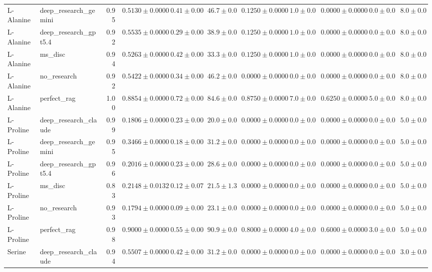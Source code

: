 \begin{table}[htbp]
\begin{tabular}{llrrrrrrrrr}
L-Alanine & deep_research_gemini & 0.95 & $0.5130 \pm 0.0000$ & $0.41 \pm 0.00$ & $46.7 \pm 0.0$ & $0.1250 \pm 0.0000$ & $1.0 \pm 0.0$ & $0.0000 \pm 0.0000$ & $0.0 \pm 0.0$ & $8.0 \pm 0.0$ \\
L-Alanine & deep_research_gpt5.4 & 0.92 & $0.5535 \pm 0.0000$ & $0.29 \pm 0.00$ & $38.9 \pm 0.0$ & $0.1250 \pm 0.0000$ & $1.0 \pm 0.0$ & $0.0000 \pm 0.0000$ & $0.0 \pm 0.0$ & $8.0 \pm 0.0$ \\
L-Alanine & ms_disc & 0.94 & $0.5263 \pm 0.0000$ & $0.42 \pm 0.00$ & $33.3 \pm 0.0$ & $0.1250 \pm 0.0000$ & $1.0 \pm 0.0$ & $0.0000 \pm 0.0000$ & $0.0 \pm 0.0$ & $8.0 \pm 0.0$ \\
L-Alanine & no_research & 0.92 & $0.5422 \pm 0.0000$ & $0.34 \pm 0.00$ & $46.2 \pm 0.0$ & $0.0000 \pm 0.0000$ & $0.0 \pm 0.0$ & $0.0000 \pm 0.0000$ & $0.0 \pm 0.0$ & $8.0 \pm 0.0$ \\
L-Alanine & perfect_rag & 1.00 & \cellcolor{green!25}$0.8854 \pm 0.0000$ & $0.72 \pm 0.00$ & $84.6 \pm 0.0$ & $0.8750 \pm 0.0000$ & $7.0 \pm 0.0$ & $0.6250 \pm 0.0000$ & $5.0 \pm 0.0$ & $8.0 \pm 0.0$ \\
\midrule
L-Proline & deep_research_claude & 0.99 & $0.1806 \pm 0.0000$ & $0.23 \pm 0.00$ & $20.0 \pm 0.0$ & $0.0000 \pm 0.0000$ & $0.0 \pm 0.0$ & $0.0000 \pm 0.0000$ & $0.0 \pm 0.0$ & $5.0 \pm 0.0$ \\
L-Proline & deep_research_gemini & 0.95 & $0.3466 \pm 0.0000$ & $0.18 \pm 0.00$ & $31.2 \pm 0.0$ & $0.0000 \pm 0.0000$ & $0.0 \pm 0.0$ & $0.0000 \pm 0.0000$ & $0.0 \pm 0.0$ & $5.0 \pm 0.0$ \\
L-Proline & deep_research_gpt5.4 & 0.96 & $0.2016 \pm 0.0000$ & $0.23 \pm 0.00$ & $28.6 \pm 0.0$ & $0.0000 \pm 0.0000$ & $0.0 \pm 0.0$ & $0.0000 \pm 0.0000$ & $0.0 \pm 0.0$ & $5.0 \pm 0.0$ \\
L-Proline & ms_disc & 0.83 & $0.2148 \pm 0.0132$ & $0.12 \pm 0.07$ & $21.5 \pm 1.3$ & $0.0000 \pm 0.0000$ & $0.0 \pm 0.0$ & $0.0000 \pm 0.0000$ & $0.0 \pm 0.0$ & $5.0 \pm 0.0$ \\
L-Proline & no_research & 0.93 & \cellcolor{red!25}$0.1794 \pm 0.0000$ & $0.09 \pm 0.00$ & $23.1 \pm 0.0$ & $0.0000 \pm 0.0000$ & $0.0 \pm 0.0$ & $0.0000 \pm 0.0000$ & $0.0 \pm 0.0$ & $5.0 \pm 0.0$ \\
L-Proline & perfect_rag & 0.98 & \cellcolor{green!25}$0.9000 \pm 0.0000$ & $0.55 \pm 0.00$ & $90.9 \pm 0.0$ & $0.8000 \pm 0.0000$ & $4.0 \pm 0.0$ & $0.6000 \pm 0.0000$ & $3.0 \pm 0.0$ & $5.0 \pm 0.0$ \\
\midrule
Serine & deep_research_claude & 0.94 & \cellcolor{red!25}$0.5507 \pm 0.0000$ & $0.42 \pm 0.00$ & $31.2 \pm 0.0$ & $0.0000 \pm 0.0000$ & $0.0 \pm 0.0$ & $0.0000 \pm 0.0000$ & $0.0 \pm 0.0$ & $3.0 \pm 0.0$ \\

\end{tabular}
\end{table}
